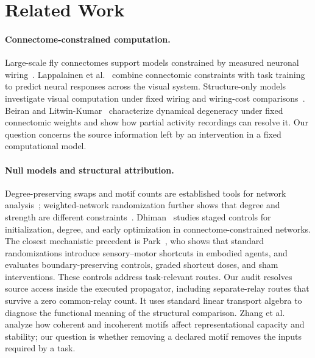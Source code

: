 \section{Related Work}
\label{sec:related}

\paragraph{Connectome-constrained computation.}
Large-scale fly connectomes support models constrained by measured neuronal
wiring~\cite{dorkenwald2024,malecns2026}. Lappalainen et
al.~\cite{lappalainen2024} combine connectomic constraints with task training
to predict neural responses across the visual system. Structure-only models
investigate visual computation under fixed wiring and wiring-cost
comparisons~\cite{structure2026}. Beiran and Litwin-Kumar~\cite{beiran2025} characterize dynamical
degeneracy under fixed connectomic weights and show how partial activity
recordings can resolve it. Our question concerns the source information
left by an intervention in a fixed computational model.

\paragraph{Null models and structural attribution.}
Degree-preserving swaps and motif counts are established tools for network
analysis~\cite{maslov2002,milo2002}; weighted-network randomization further
shows that degree and strength are different constraints~\cite{milisav2025}.
Dhiman~\cite{dhiman2026} studies staged controls for initialization, degree,
and early optimization in connectome-constrained networks. The closest
mechanistic precedent is Park~\cite{park2026}, who shows that standard
randomizations introduce sensory--motor shortcuts in embodied agents,
and evaluates boundary-preserving controls, graded shortcut doses, and sham
interventions. These controls address task-relevant routes. Our audit resolves source
access inside the executed propagator, including separate-relay routes
that survive a zero common-relay count. It uses standard linear transport
algebra to diagnose the functional meaning of the structural comparison.
Zhang et al.~\cite{zhang2025motifs} analyze how coherent and incoherent
motifs affect representational capacity and stability; our question is
whether removing a declared motif removes the inputs required by a task.

